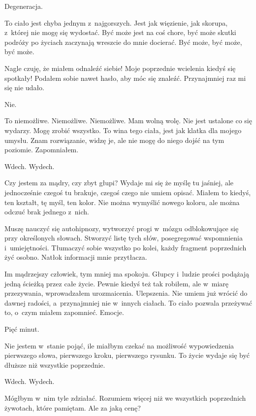 Degeneracja.

To ciało jest chyba jednym z~najgorszych. Jest jak więzienie, jak skorupa, z~której nie mogę się wydostać. Być może jest na coś chore, być może skutki podróży po życiach zaczynają wreszcie do mnie docierać. Być może, być może, być może.

Nagle czuję, że miałem odnaleźć siebie! Moje poprzednie wcielenia kiedyś się spotkały! Podałem sobie nawet hasło, aby móc się znaleźć. Przynajmniej raz mi się nie udało.

Nie.

To niemożliwe. Niemożliwe. Niemożliwe. Mam wolną wolę. Nie jest ustalone co się wydarzy. Mogę zrobić wszystko. To wina tego ciała, jest jak klatka dla mojego umysłu. Znam rozwiązanie, widzę je, ale nie mogę do niego dojść na tym poziomie. Zapomniałem.

\begin{itquote}
Wdech. Wydech.
\end{itquote}

Czy jestem za mądry, czy zbyt głupi? Wydaje mi się że myślę tu jaśniej, ale jednocześnie czegoś tu brakuje, czegoś czego nie umiem opisać. Miałem to kiedyś, ten kształt, tę myśl, ten kolor. Nie można wymyślić nowego koloru, ale można odczuć brak jednego z~nich. 

Muszę nauczyć się autohipnozy, wytworzyć progi w~mózgu odblokowujące się przy określonych słowach. Stworzyć listę tych słów, posegregować wspomnienia i~umiejętności. Tłumaczyć sobie wszystko po kolei, każdy fragment poprzednich żyć osobno. Natłok informacji mnie przytłacza.

Im mądrzejszy człowiek, tym mniej ma spokoju. Głupcy i~ludzie prości podążają jedną ścieżką przez całe życie. Pewnie kiedyś też tak robiłem, ale w~miarę przezywania, wprowadzałem urozmaicenia. Ulepszenia. Nie umiem już wrócić do dawnej radości, a~przynajmniej nie w~innych ciałach. To ciało pozwala przeżywać to, o~czym miałem zapomnieć. Emocje.

Pięć minut.

Nie jestem w~stanie pojąć, ile miałbym czekać na możliwość wypowiedzenia pierwszego słowa, pierwszego kroku, pierwszego rysunku. To życie wydaje się być dłuższe niż wszystkie poprzednie.

\begin{itquote}
Wdech. Wydech.
\end{itquote}

Mógłbym w~nim tyle zdziałać. Rozumiem więcej niż we wszystkich poprzednich żywotach, które pamiętam. Ale za jaką cenę? 

